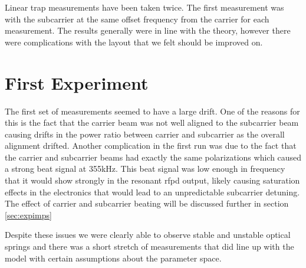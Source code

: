 Linear trap measurements have been taken twice.
The first measurement was with the subcarrier at the same offset frequency from
the carrier for each measurement.
The results generally were in line with the theory, however there were
complications with the layout that we felt should be improved on.

\section{First Experiment}


The first set of measurements seemed to have a large drift.
One of the reasons for this is the fact that the carrier beam was not
well aligned to the subcarrier beam causing drifts in the power ratio between
carrier and subcarrier as the overall alignment drifted.
Another complication in the first run was due to the fact that the carrier and
subcarrier beams had exactly the same polarizations which caused a strong
beat signal at 355kHz. This beat signal was low enough in frequency that
it would show strongly in the resonant \ac{rfpd} output, likely causing
saturation effects in the electronics that would lead to an unpredictable
subcarrier detuning.
The effect of carrier and subcarrier beating will be discussed further in
section \ref{sec:expimps}

Despite these issues we were clearly able to observe
stable and unstable optical springs and there was a short stretch of
measurements that did line up with the model with certain assumptions
about the parameter space.


